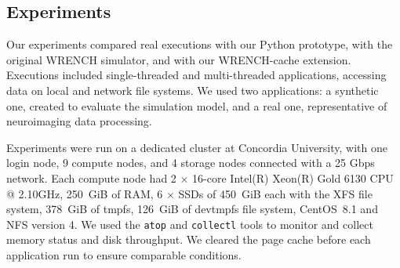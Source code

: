 \documentclass[conference]{IEEEtran}
\newcommand{\wrench}{WRENCH\xspace}
\begin{document}
        \subsection{Experiments}

        Our experiments compared real executions with our Python prototype,
        with the original \wrench simulator, and with our \wrench-cache
        extension. Executions included single-threaded and multi-threaded
        applications, accessing data on local and network file systems. We
        used two applications: a synthetic one, created to evaluate the
        simulation model, and a real one, representative of neuroimaging
        data processing.

        Experiments were run on a dedicated cluster at
        Concordia University, with one login node, 9 compute nodes, and 4
        storage nodes connected with a 25 Gbps network. Each
        compute node had 2 $\times$ 16-core Intel(R) Xeon(R) Gold 6130 CPU
        @ 2.10GHz, 250~GiB of RAM, 6 $\times$ SSDs of 450~GiB each with the XFS
        file system, 378~GiB of tmpfs, 126~GiB of devtmpfs file system,
        CentOS~8.1 and NFS version 4. We used the \texttt{atop}
        and \texttt{collectl} tools to monitor and collect memory status
        and disk throughput. We cleared the page
        cache before each application run to ensure comparable
        conditions.
\end{document}
